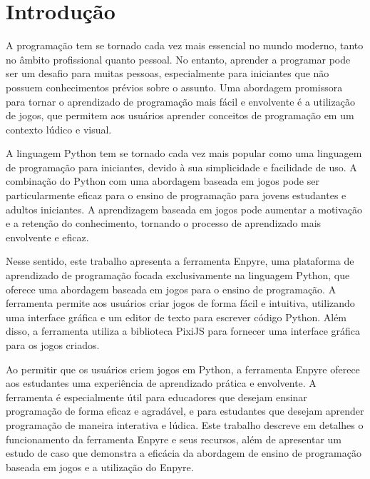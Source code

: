 \chapter[Introdução]{Introdução}

A programação tem se tornado cada vez mais essencial no mundo moderno, tanto no âmbito profissional quanto pessoal. No entanto, aprender a programar pode ser um desafio para muitas pessoas, especialmente para iniciantes que não possuem conhecimentos prévios sobre o assunto. Uma abordagem promissora para tornar o aprendizado de programação mais fácil e envolvente é a utilização de jogos, que permitem aos usuários aprender conceitos de programação em um contexto lúdico e visual.

A linguagem Python tem se tornado cada vez mais popular como uma linguagem de programação para iniciantes, devido à sua simplicidade e facilidade de uso. A combinação do Python com uma abordagem baseada em jogos pode ser particularmente eficaz para o ensino de programação para jovens estudantes e adultos iniciantes. A aprendizagem baseada em jogos pode aumentar a motivação e a retenção do conhecimento, tornando o processo de aprendizado mais envolvente e eficaz.

Nesse sentido, este trabalho apresenta a ferramenta Enpyre, uma plataforma de aprendizado de programação focada exclusivamente na linguagem Python, que oferece uma abordagem baseada em jogos para o ensino de programação. A ferramenta permite aos usuários criar jogos de forma fácil e intuitiva, utilizando uma interface gráfica e um editor de texto para escrever código Python. Além disso, a ferramenta utiliza a biblioteca PixiJS para fornecer uma interface gráfica para os jogos criados.

Ao permitir que os usuários criem jogos em Python, a ferramenta Enpyre oferece aos estudantes uma experiência de aprendizado prática e envolvente. A ferramenta é especialmente útil para educadores que desejam ensinar programação de forma eficaz e agradável, e para estudantes que desejam aprender programação de maneira interativa e lúdica. Este trabalho descreve em detalhes o funcionamento da ferramenta Enpyre e seus recursos, além de apresentar um estudo de caso que demonstra a eficácia da abordagem de ensino de programação baseada em jogos e a utilização do Enpyre.
